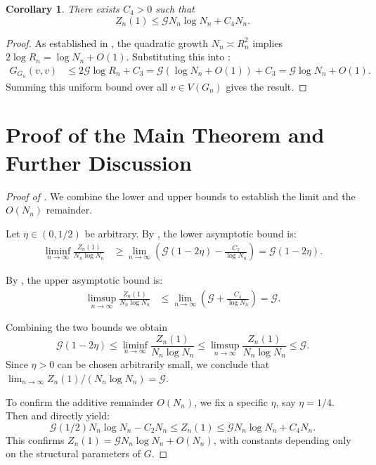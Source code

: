 \documentclass{article}
\numberwithin{equation}{section}
\newtheorem{corollary}[theorem]{Corollary}
\theoremstyle{definition}
\theoremstyle{remark}
\newcommand{\cG}{\mathcal{G}}
\begin{document}
\begin{corollary}\label{cor:upper}
There exists $C_4 > 0$ such that
\[
Z_n(1) \leq \cG N_n \log N_n + C_4 N_n.
\]
\end{corollary}

\begin{proof}
As established in , the quadratic growth $N_n \asymp R_n^2$ implies $2\log R_n = \log N_n + O(1)$. Substituting this into :
\begin{align*}
G_{G_n}(v,v) &\leq 2\cG \log R_n + C_3 = \cG (\log N_n + O(1)) + C_3 = \cG \log N_n + O(1).
\end{align*}
Summing this uniform bound over all $v \in V(G_n)$ gives the result.
\end{proof}

\section{Proof of the Main Theorem and Further Discussion}\label{sec:discussion}

\begin{proof}[Proof of ]
We combine the lower and upper bounds to establish the limit and the $O(N_n)$ remainder.

Let $\eta \in (0,1/2)$ be arbitrary. By , the lower asymptotic bound is:
\begin{align*}
\liminf_{n \to \infty} \frac{Z_n(1)}{N_n \log N_n} &\geq \lim_{n \to \infty} \left( \cG(1-2\eta) - \frac{C_2}{\log N_n} \right) = \cG(1-2\eta).
\end{align*}

By , the upper asymptotic bound is:
\begin{align*}
\limsup_{n \to \infty} \frac{Z_n(1)}{N_n \log N_n} &\leq \lim_{n \to \infty} \left( \cG + \frac{C_4}{\log N_n} \right) = \cG.
\end{align*}

Combining the two bounds we obtain
\[
\cG(1-2\eta) \leq \liminf_{n \to \infty} \frac{Z_n(1)}{N_n \log N_n} \leq \limsup_{n \to \infty} \frac{Z_n(1)}{N_n \log N_n} \leq \cG.
\]
Since $\eta > 0$ can be chosen arbitrarily small, we conclude that $\lim_{n \to \infty} Z_n(1) / (N_n \log N_n) = \cG$.

To confirm the additive remainder $O(N_n)$, we fix a specific $\eta$, say $\eta=1/4$. Then  and  directly yield:
\[
\cG(1/2) N_n \log N_n - C_2 N_n \leq Z_n(1) \leq \cG N_n \log N_n + C_4 N_n.
\]
This confirms $Z_n(1) = \cG N_n \log N_n + O(N_n)$, with constants depending only on the structural parameters of $G$.
\end{proof}
\end{document}
